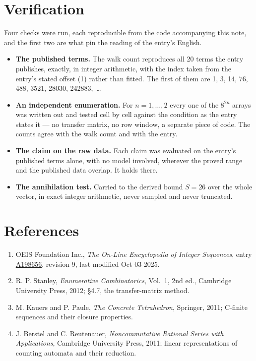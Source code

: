 \documentclass[11pt]{article}
\theoremstyle{definition}
\begin{document}
\section{Verification}

Four checks were run, each reproducible from the code accompanying this note, and the first two are what pin the reading of the entry's English.

\begin{itemize}

\item {\bfseries The published terms.} The walk count reproduces all 20 terms the entry publishes, exactly, in integer arithmetic, with the index taken from the entry's stated offset (1) rather than fitted. The first of them are 1, 3, 14, 76, 488, 3521, 28030, 242883,~\dots

\item {\bfseries An independent enumeration.} For $n = 1,\dots,2$ every one of the $8^{2n}$ arrays was written out and tested cell by cell against the condition as the entry states it --- no transfer matrix, no row window, a separate piece of code. The counts agree with the walk count and with the entry.

\item {\bfseries The claim on the raw data.} Each claim was evaluated on the entry's published terms alone, with no model involved, wherever the proved range and the published data overlap. It holds there.

\item {\bfseries The annihilation test.} Carried to the derived bound $S = 26$ over the whole vector, in exact integer arithmetic, never sampled and never truncated.

\end{itemize}

\section{References}

\begin{enumerate}

\item OEIS Foundation Inc., \emph{The On-Line Encyclopedia of Integer Sequences}, entry \href{https://oeis.org/A198656}{A198656}, revision 9, last modified Oct 03 2025.

\item R. P. Stanley, \emph{Enumerative Combinatorics}, Vol.~1, 2nd ed., Cambridge University Press, 2012; \S4.7, the transfer-matrix method.

\item M. Kauers and P. Paule, \emph{The Concrete Tetrahedron}, Springer, 2011; C-finite sequences and their closure properties.

\item J. Berstel and C. Reutenauer, \emph{Noncommutative Rational Series with Applications}, Cambridge University Press, 2011; linear representations of counting automata and their reduction.

\end{enumerate}
\end{document}
